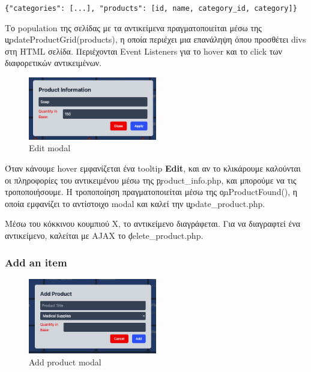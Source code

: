         \begin{graycomment}
            \verb|{"categories": [...], "products": [id, name, category_id, category]}|
        \end{graycomment}

        Το population της σελίδας με τα αντικείμενα πραγματοποιείται μέσω της \c{updateProductGrid(products)}, η οποία περιέχει μια επανάληψη όπου προσθέτει divs στη HTML σελίδα.
        Περιέχονται Event Listeners για το hover και το click των διαφορετικών αντικειμένων.

        \begin{figure}[H] \noindent \centering
            \includegraphics[width=0.5\textwidth]{img/admin-base-edit}
            \caption{Edit modal}
        \end{figure}

        Όταν κάνουμε hover εμφανίζεται ένα tooltip \textbf{Edit}, και αν το κλικάρουμε καλούνται οι πληροφορίες του αντικειμένου μέσω της \c{product\_info.php}, και μπορούμε να τις τροποποιήσουμε.
        Η τροποποίηση πραγματοποιείται μέσω της \c{onProductFound()}, η οποία εμφανίζει το αντίστοιχο modal και καλεί την \c{update\_product.php}.

        Μέσω του κόκκινου κουμπιού Χ, το αντικείμενο διαγράφεται.
        Για να διαγραφτεί ένα αντικείμενο, καλείται με AJAX το \c{delete\_product.php}.

        \subsubsection{Add an item}
            \begin{figure}[H] \noindent \centering
                \includegraphics[width=0.5\textwidth]{img/admin-base-add}
                \caption{Add product modal}
            \end{figure}

